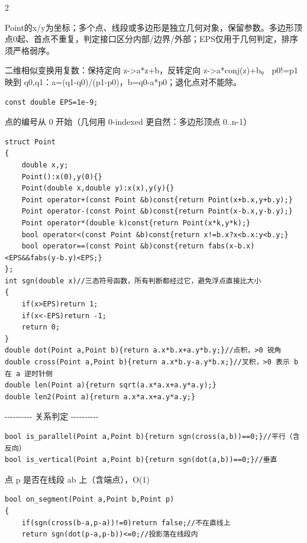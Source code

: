 \documentclass[UTF8,fontset=fandol,a4paper,twoside]{ctexart}
\newcommand{\note}[1]{{\fontsize{10}{12}\selectfont #1\par}}
\begin{document}
\begin{multicols}{2}
\note{Point的x/\allowbreak{}y为坐标；多个点、线段或多边形是独立几何对象，保留参数。多边形顶点0起、首点不重复，判定接口区分内部/\allowbreak{}边界/\allowbreak{}外部；EPS仅用于几何判定，排序须严格弱序。}
\note{二维相似变换用复数：保持定向 z-\allowbreak{}>\allowbreak{}a*z+\allowbreak{}b，反转定向 z-\allowbreak{}>\allowbreak{}a*conj(\allowbreak{}z)\allowbreak{}+\allowbreak{}b。 p0!=\allowbreak{}p1 映到 q0,\allowbreak{}q1：a=\allowbreak{}(\allowbreak{}q1-\allowbreak{}q0)\allowbreak{}/\allowbreak{}(\allowbreak{}p1-\allowbreak{}p0)\allowbreak{}，b=\allowbreak{}q0-\allowbreak{}a*p0；退化点对不能除。}
\begin{lstlisting}
const double EPS=1e-9;
\end{lstlisting}
\note{点的编号从 0 开始（几何用 0-\allowbreak{}indexed 更自然：多边形顶点 0.\allowbreak{}.\allowbreak{}n-\allowbreak{}1）}
\begin{lstlisting}
struct Point
{
    double x,y;
    Point():x(0),y(0){}
    Point(double x,double y):x(x),y(y){}
    Point operator+(const Point &b)const{return Point(x+b.x,y+b.y);}
    Point operator-(const Point &b)const{return Point(x-b.x,y-b.y);}
    Point operator*(double k)const{return Point(x*k,y*k);}
    bool operator<(const Point &b)const{return x!=b.x?x<b.x:y<b.y;}
    bool operator==(const Point &b)const{return fabs(x-b.x)<EPS&&fabs(y-b.y)<EPS;}
};
int sgn(double x)//三态符号函数，所有判断都经过它，避免浮点直接比大小
{
    if(x>EPS)return 1;
    if(x<-EPS)return -1;
    return 0;
}
double dot(Point a,Point b){return a.x*b.x+a.y*b.y;}//点积，>0 锐角
double cross(Point a,Point b){return a.x*b.y-a.y*b.x;}//叉积，>0 表示 b 在 a 逆时针侧
double len(Point a){return sqrt(a.x*a.x+a.y*a.y);}
double len2(Point a){return a.x*a.x+a.y*a.y;}
\end{lstlisting}
\note{-\allowbreak{}-\allowbreak{}-\allowbreak{}-\allowbreak{}-\allowbreak{}-\allowbreak{}-\allowbreak{}-\allowbreak{}-\allowbreak{}-\allowbreak{} 关系判定 -\allowbreak{}-\allowbreak{}-\allowbreak{}-\allowbreak{}-\allowbreak{}-\allowbreak{}-\allowbreak{}-\allowbreak{}-\allowbreak{}-\allowbreak{}}
\begin{lstlisting}
bool is_parallel(Point a,Point b){return sgn(cross(a,b))==0;}//平行（含反向）
bool is_vertical(Point a,Point b){return sgn(dot(a,b))==0;}//垂直
\end{lstlisting}
\note{点 p 是否在线段 ab 上（含端点），O(\allowbreak{}1)\allowbreak{}}
\begin{lstlisting}
bool on_segment(Point a,Point b,Point p)
{
    if(sgn(cross(b-a,p-a))!=0)return false;//不在直线上
    return sgn(dot(p-a,p-b))<=0;//投影落在线段内

\end{lstlisting}
\end{multicols}
\end{document}

